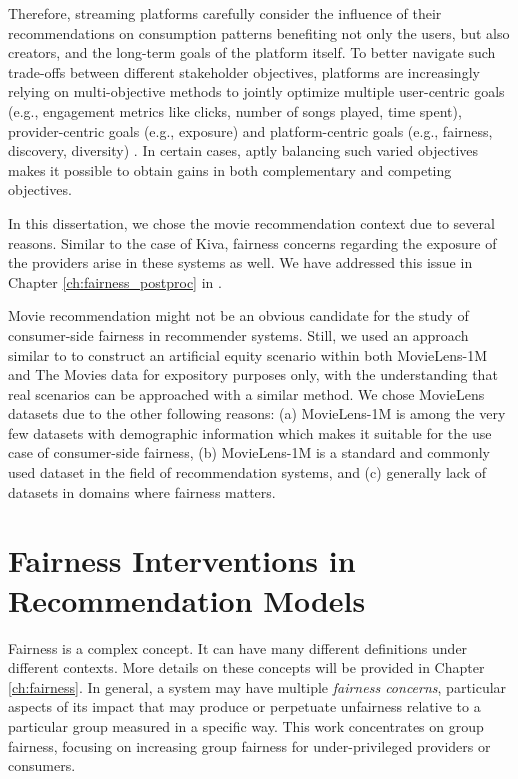     Therefore, streaming platforms carefully consider the influence of their recommendations on consumption patterns benefiting not only the users, but also creators, and the long-term goals of the platform itself. To better navigate such trade-offs between different stakeholder objectives, platforms are increasingly relying on multi-objective methods to jointly optimize multiple user-centric goals (e.g., engagement metrics like clicks, number of songs played, time spent), provider-centric goals (e.g., exposure) and platform-centric goals (e.g., fairness, discovery, diversity) \cite{mehrotra2020bandit}. In certain cases, aptly balancing such varied objectives makes it possible to obtain gains in both complementary and competing objectives.
    
    In this dissertation, we chose the movie recommendation context due to several reasons. Similar to the case of Kiva, fairness concerns regarding the exposure of the providers arise in these systems as well. We have addressed this issue in Chapter \ref{ch:fairness_postproc} in \cite{sonboli2020opportunistic,liu2019farpfar}.
    
    
    Movie recommendation might not be an obvious candidate for the study of consumer-side fairness in recommender systems. Still, we used an approach similar to \cite{yao2017beyond} to construct an artificial equity scenario within both MovieLens-1M and The Movies data for expository purposes only, with the understanding that real scenarios can be approached with a similar method. We chose MovieLens datasets due to the other following reasons: (a) MovieLens-1M is among the very few datasets with demographic information which makes it suitable for the use case of consumer-side fairness, (b) MovieLens-1M is a standard and commonly used dataset in the field of recommendation systems, and (c) generally lack of datasets in domains where fairness matters.


\section{Fairness Interventions in Recommendation Models}

    Fairness is a complex concept. It can have many different definitions under different contexts. More details on these concepts will be provided in Chapter \ref{ch:fairness}. In general, a system may have multiple \textit{fairness concerns}, particular aspects of its impact that may produce or perpetuate unfairness relative to a particular group measured in a specific way. This work concentrates on group fairness, focusing on increasing group fairness for under-privileged providers or consumers. %
    
